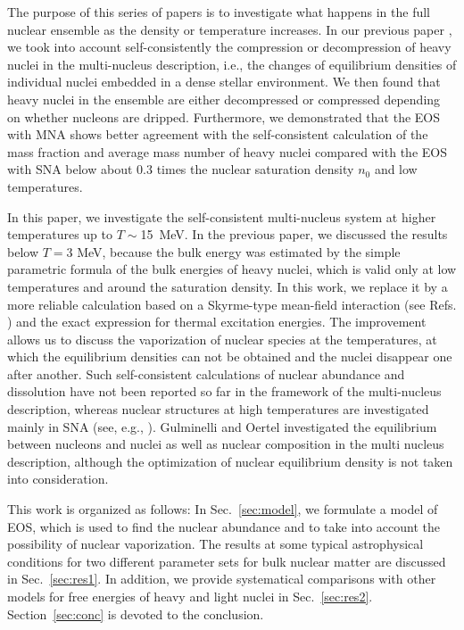 \documentclass[preprint]{revtex4}
\begin{document}
The purpose of this series of papers is to investigate what happens in the full nuclear ensemble as
 the density or temperature increases.
In our previous paper \cite{furusawa17c}, we took into account self-consistently the compression or decompression of heavy nuclei in the multi-nucleus description, i.e., the changes of equilibrium densities of individual nuclei embedded in a dense stellar environment. We then found that heavy nuclei in the ensemble are either decompressed or
compressed depending on whether nucleons are dripped. Furthermore, we demonstrated that the EOS with MNA shows better agreement with the self-consistent calculation of the mass fraction and average mass number of heavy nuclei compared with the EOS with SNA below about  $0.3$ times the nuclear saturation density $n_0$
and low temperatures. 

In this paper, we investigate the self-consistent multi-nucleus system at higher temperatures up to $T \sim$15~MeV. 
In the previous paper, we discussed  the results below $T= 3$ MeV, because
the bulk energy was estimated by the simple parametric formula of the bulk energies of heavy nuclei, which is valid only at low temperatures and around the saturation density.
In this work, we replace it by a more reliable calculation based on a Skyrme-type mean-field interaction (see Refs. \cite{khodel87,smirnov88,oyamatsu93,fayans00,oyamatsu03})
and the exact expression for thermal excitation energies. 
The improvement allows us to discuss the vaporization of  nuclear species at the temperatures, 
at which the equilibrium densities can not be obtained and the nuclei disappear one after another.
{%
Such self-consistent calculations of nuclear abundance and dissolution have not been reported so far in the framework of the multi-nucleus description, whereas nuclear structures  at high temperatures are investigated mainly in SNA (see, e.g., \cite{newton09}).
Gulminelli and Oertel \cite{gulminelli15} investigated 
the equilibrium between nucleons and nuclei as well as nuclear composition in the multi nucleus description, although the optimization of nuclear equilibrium density is not taken into consideration.}

This work is organized as follows:
In Sec.~\ref{sec:model}, we formulate a model of EOS,
which is used  to find the nuclear abundance and to take into account the possibility  of nuclear vaporization. 
The results at  some typical astrophysical conditions for two different parameter sets for bulk nuclear matter
 are discussed in Sec.~\ref{sec:res1}.
{%
In addition, we provide systematical comparisons with other models for free energies of heavy and light nuclei in Sec.~\ref{sec:res2}.}
Section~\ref{sec:conc} is devoted to the conclusion. 
\end{document}
